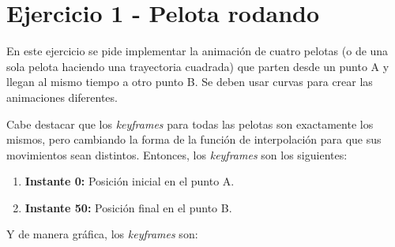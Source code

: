 \documentclass{article}
\begin{document}
\section{Ejercicio 1 - Pelota rodando}
{\color{green}
En este ejercicio se pide implementar la animación de cuatro pelotas (o de una sola pelota haciendo una trayectoria cuadrada) que parten desde un punto A y llegan al mismo tiempo a otro punto B. Se deben usar curvas para crear las animaciones diferentes.

\bigskip

Cabe destacar que los \textit{keyframes} para todas las pelotas son exactamente los mismos, pero cambiando la forma de la función de interpolación para que sus movimientos sean distintos. Entonces, los \textit{keyframes} son los siguientes:

\begin{enumerate}
    \item \textbf{Instante 0:} Posición inicial en el punto A.
    \item \textbf{Instante 50:} Posición final en el punto B.
\end{enumerate}

Y de manera gráfica, los \textit{keyframes} son:

}
\end{document}
